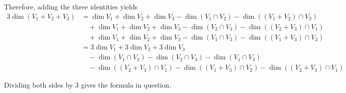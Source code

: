 \begin{xrcs}
  Therefore, adding the three identities yields
  \begin{equation}
    \begin{aligned}
      3 \dim (V_1 + V_2 + V_3) &=
      \dim V_1 + \dim V_2 + \dim V_3 - \dim(V_1 \cap V_2) - \dim ((V_1 + V_2) \cap V_3) \\
      & \quad + \dim V_1 + \dim V_2 + \dim V_3 - \dim(V_2 \cap V_3) - \dim ((V_2 + V_3) \cap V_1) \\
      & \quad + \dim V_1 + \dim V_2 + \dim V_3 - \dim(V_1 \cap V_3) - \dim ((V_1 + V_3) \cap V_2) \\
      & = 3 \dim V_1 + 3 \dim V_2 + 3 \dim V_3 \\
      & \quad - \dim(V_1 \cap V_2) - \dim(V_2 \cap V_3) - \dim(V_1 \cap V_3) \\
      & \quad - \dim ((V_2 + V_3) \cap V_1) - \dim ((V_1 + V_3) \cap V_2) - \dim ((V_2 + V_3) \cap V_1)
    \end{aligned}
  \end{equation}

  Dividing both sides by $3$ gives the formula in question.


\end{xrcs}
